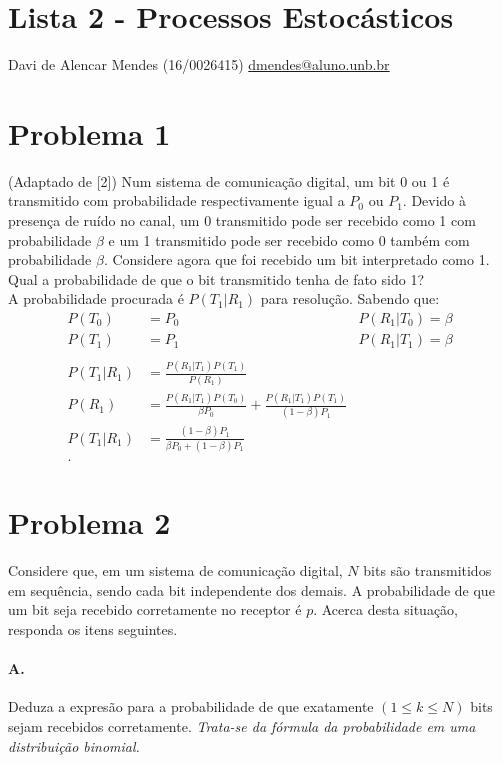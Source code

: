 \documentclass{article}
\begin{document}
\setlength{\abovedisplayskip}{12pt}
\setlength{\belowdisplayskip}{0.75em}
\setlength{\abovedisplayshortskip}{0pt}
\setlength{\belowdisplayshortskip}{0pt}
\setlength{\jot}{1pt}

\section*{Lista 2 - Processos Estocásticos}
Davi de Alencar Mendes (16/0026415) \url{dmendes@aluno.unb.br}
\section*{Problema 1}
(Adaptado de [2]) Num sistema de comunicação digital, um bit 0 ou 1 é transmitido com
probabilidade respectivamente igual a $P_0$ ou $P_1$. Devido à presença de ruído no canal, um
0 transmitido pode ser recebido como 1 com probabilidade $\beta$ e um 1 transmitido pode ser
recebido como 0 também com probabilidade $\beta$. Considere agora que foi recebido um bit
interpretado como 1. Qual a probabilidade de que o bit transmitido tenha de fato sido 1?
\\
A probabilidade procurada é $P(T_1|R_1)$ para resolução. Sabendo que:
\begin{align*}
    P(T_0) &= P_0 & P(R_1|T_0) = \beta \\
    P(T_1) &= P_1 & P(R_1|T_1) = \beta \\
    \\
    P(T_1|R_1) &= \frac{P(R_1|T_1)P(T_1)}{P(R_1)} \\
    P(R_1) &= \frac{P(R_1|T_1)P(T_0)}{\beta P_0} + \frac{P(R_1|T_1)P(T_1)}{(1-\beta)P_1} \\
    P(T_1|R_1) &= \frac{(1-\beta)P_1}{\beta P_0 + (1-\beta)P_1} \\[-0.5em]
.\end{align*}

\section*{Problema 2}
Considere que, em um sistema de comunicação digital, $N$ bits são transmitidos em sequência, sendo
cada bit independente dos demais. A probabilidade de que um bit seja recebido corretamente no
receptor é $p$. Acerca desta situação, responda os itens seguintes.

\paragraph*{A.} Deduza a expresão para a probabilidade de que exatamente $(1 \le k \le N)$ bits
sejam recebidos corretamente. \textit{Trata-se da fórmula da probabilidade em uma distribuição
binomial.}
\end{document}
